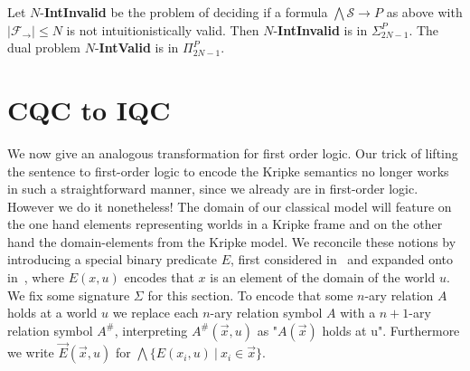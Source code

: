 \documentclass[runningheads]{llncs}
\begin{document}
\begin{corollary}
	Let $N$-\textbf{IntInvalid} be the problem of deciding if a formula $\bigwedge \mathcal S\to P$ as above with $|\mathcal F_\to|\leq N$ is not intuitionistically valid. Then $N$-\textbf{IntInvalid} is in $\Sigma_{2N-1}^P$. The dual problem $N$-\textbf{IntValid} is in $\Pi_{2N-1}^P$.
\end{corollary}


\section{CQC to IQC}

We now give an analogous transformation for first order logic. Our trick of lifting the sentence to first-order logic to encode the Kripke semantics no longer works in such a straightforward manner, since we already are in first-order logic. However we do it nonetheless! The domain of our classical model will feature on the one hand elements representing worlds in a Kripke frame and on the other hand the domain-elements from the Kripke model. We reconcile these notions by introducing a special binary predicate $E$, first considered in~\cite{baaz2006skolemization} and expanded onto in~\cite{iemhoff2010eskolemization}, where $E(x, u)$ encodes that $x$ is an element of the domain of the world $u$. We fix some signature $\Sigma$ for this section. To encode that some $n$-ary relation $A$ holds at a world $u$ we replace each $n$-ary relation symbol $A$ with a $n+1$-ary relation symbol $A^\#$, interpreting $A^\#(\vec x, u)$ as "$A(\vec x)$ holds at u". Furthermore we write $\vec E(\vec x, u)$ for $\bigwedge\{E(x_i, u)\:|\:x_i\in \vec x\}$.
\end{document}
